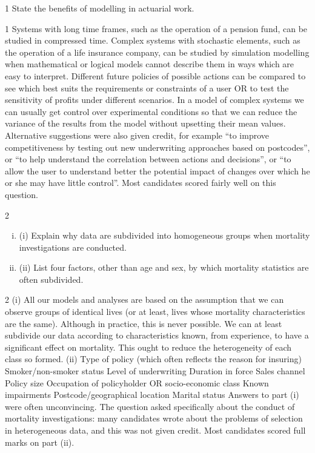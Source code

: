 \begin{enumerate}
1 State the benefits of modelling in actuarial work.

1
Systems with long time frames, such as the operation of a pension fund, can be
studied in compressed time.
Complex systems with stochastic elements, such as the operation of a life insurance
company, can be studied by simulation modelling when mathematical or logical
models cannot describe them in ways which are easy to interpret.
Different future policies of possible actions can be compared to see which best suits
the requirements or constraints of a user OR to test the sensitivity of profits under
different scenarios.
In a model of complex systems we can usually get control over experimental
conditions so that we can reduce the variance of the results from the model without
upsetting their mean values.
Alternative suggestions were also given credit, for example “to improve competitiveness by
testing out new underwriting approaches based on postcodes”, or “to help understand the
correlation between actions and decisions”, or “to allow the user to understand better the
potential impact of changes over which he or she may have little control”. Most candidates
scored fairly well on this question.

\newpage

2 
\begin{enumerate}[(i)]
\item (i) Explain why data are subdivided into homogeneous groups when mortality
investigations are conducted.
\item 
(ii) List four factors, other than age and sex, by which mortality statistics are often
subdivided.
\end{enumerate}
2
(i)
All our models and analyses are based on the assumption that we can observe
groups of identical lives (or at least, lives whose mortality characteristics are
the same).
Although in practice, this is never possible.
We can at least subdivide our data according to characteristics known, from
experience, to have a significant effect on mortality.
This ought to reduce the heterogeneity of each class so formed.
(ii)
Type of policy (which often reflects the reason for insuring)
Smoker/non-smoker status
Level of underwriting
Duration in force
Sales channel
Policy size
Occupation of policyholder OR socio-economic class
Known impairments
Postcode/geographical location
Marital status
Answers to part (i) were often unconvincing. The question asked specifically about the
conduct of mortality investigations: many candidates wrote about the problems of selection in
heterogeneous data, and this was not given credit. Most candidates scored full marks on
part (ii).


\end{enumerate}
